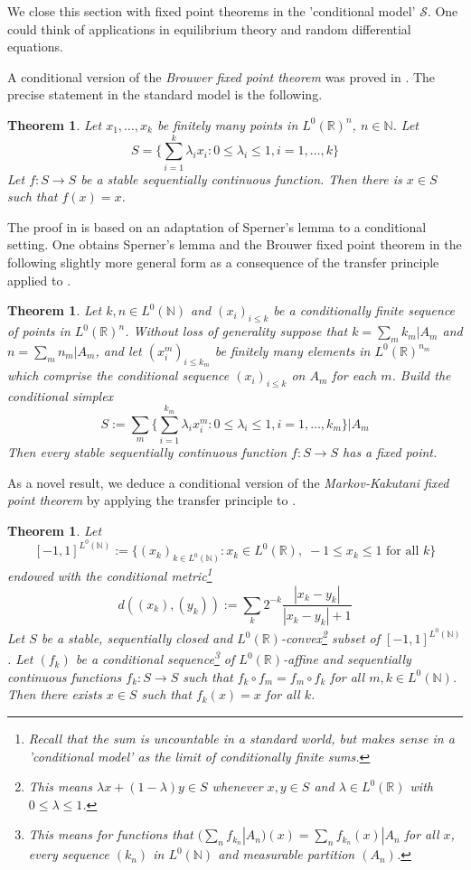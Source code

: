 \documentclass{jloganal}
\numberwithin{equation}{section}
\theoremstyle{plain}
\newtheorem{theorem}[subsection]{Theorem}
\renewcommand{\leq}{\leqslant}
\newcommand\N{\mathbb{N}}
\begin{document}
We close this section with fixed point theorems in the 'conditional model' $\mathcal{S}$. 
One could think of applications in equilibrium theory and random differential equations. 
 
A conditional version of the \emph{Brouwer fixed point theorem} was proved in \cite{drapeau2013brouwer}.  
The precise statement in the standard model is the following. 
\begin{theorem}
Let $x_1,\ldots,x_k$ be finitely many points in $L^0(\mathbb{R})^n$, $n\in \mathbb{N}$.  
Let 
\[
S=\Bigg\{\sum_{i=1}^k \lambda_i x_i\colon 0\leq \lambda_i\leq 1, i=1,\ldots,k\Bigg\}
\]
Let $f\colon S\to S$ be a stable sequentially continuous function.  
Then there is $x\in S$ such that $f(x)=x$.  
\end{theorem}
The proof in \cite{drapeau2013brouwer} is based on an adaptation of Sperner's lemma to a conditional setting.  
One obtains Sperner's lemma and the Brouwer fixed point theorem in the following slightly more general form as a consequence of the transfer principle applied to \cite[Theorem IV.7.6]{simpson2009subsystems}.
\begin{theorem}
Let $k,n\in L^0(\N)$ and $(x_i)_{i\leq k}$ be a conditionally finite sequence of points in $L^0(\mathbb{R})^n$. 
Without loss of generality suppose that $k=\sum_m k_m|A_m$ and $n=\sum_m n_m|A_m$, and let $(x^m_i)_{i\leq k_m}$ be finitely many elements in $L^0(\mathbb{R})^{n_m}$ which comprise the conditional sequence $(x_i)_{i\leq k}$ on $A_m$ for each $m$. 
Build the conditional simplex
\[
S:=\sum_m \Bigg\{\sum_{i=1}^{k_m} \lambda_i x^m_i\colon 0\leq \lambda_i\leq 1, i=1,\ldots,k_m\Bigg\}\Bigg|A_m
\]  
Then every stable sequentially continuous function $f\colon S\to S$ has a fixed point.  
\end{theorem}
As a novel result, we deduce a conditional version of the \emph{Markov-Kakutani fixed point theorem} by applying the transfer principle to \cite[Lemma IV.9.1]{simpson2009subsystems}. 
\begin{theorem}
Let  
\[
[-1,1]^{L^0(\N)}:=\{(x_k)_{k\in L^0(\N)}\colon x_k\in L^0(\mathbb{R}),\; -1\leq x_k\leq 1 \text{ for all } k\}
\]
endowed with the conditional metric\footnote{Recall that the sum is uncountable in a standard world, but makes sense in a 'conditional model' as the limit of conditionally finite sums.}  
\[
d((x_k),(y_k)):=\sum_k 2^{-k}\frac{|x_k-y_k|}{|x_k-y_k|+1}
\]
Let $S$ be a stable, sequentially closed and $L^0(\mathbb{R})$-convex\footnote{This means $\lambda x + (1-\lambda)y\in S$ whenever $x,y\in S$ and $\lambda\in L^0(\mathbb{R})$ with $0\leq \lambda \leq 1$.} subset of $[-1,1]^{L^0(\N)}$.  
Let $(f_k)$ be a conditional sequence\footnote{This means for functions that $\big(\sum_n f_{k_n}|A_n\big)(x)=\sum_n f_{k_n}(x)|A_n$ for all $x$, every sequence $(k_n)$ in $L^0(\mathbb{N})$ and measurable partition $(A_n)$.} of $L^0(\mathbb{R})$-affine and sequentially continuous functions $f_k\colon S\to S$ such that $f_k\circ f_m=f_m\circ f_k$ for all $m,k\in L^0(\N)$.  
Then there exists $x\in S$ such that $f_k(x)=x$ for all $k$. 
\end{theorem}
\end{document}
